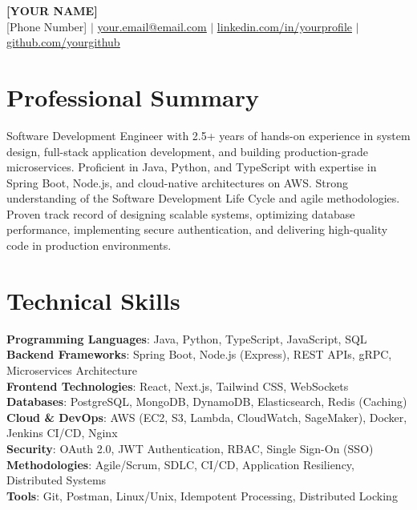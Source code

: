 \documentclass[letterpaper,11pt]{article}
\begin{document}
\begin{center}
    \textbf{\Huge \scshape [YOUR NAME]} \\ \vspace{1pt}
    \small [Phone Number] $|$ \href{mailto:your.email@email.com}{\underline{your.email@email.com}} $|$ 
    \href{https://linkedin.com/in/yourprofile}{\underline{linkedin.com/in/yourprofile}} $|$
    \href{https://github.com/yourgithub}{\underline{github.com/yourgithub}}
\end{center}

\section{Professional Summary}
Software Development Engineer with 2.5+ years of hands-on experience in system design, full-stack application development, and building production-grade microservices. Proficient in Java, Python, and TypeScript with expertise in Spring Boot, Node.js, and cloud-native architectures on AWS. Strong understanding of the Software Development Life Cycle and agile methodologies. Proven track record of designing scalable systems, optimizing database performance, implementing secure authentication, and delivering high-quality code in production environments.

\section{Technical Skills}
 \begin{itemize}[leftmargin=0.15in, label={}]
    \small{\item{
     \textbf{Programming Languages}{: Java, Python, TypeScript, JavaScript, SQL} \\
     \textbf{Backend Frameworks}{: Spring Boot, Node.js (Express), REST APIs, gRPC, Microservices Architecture} \\
     \textbf{Frontend Technologies}{: React, Next.js, Tailwind CSS, WebSockets} \\
     \textbf{Databases}{: PostgreSQL, MongoDB, DynamoDB, Elasticsearch, Redis (Caching)} \\
     \textbf{Cloud \& DevOps}{: AWS (EC2, S3, Lambda, CloudWatch, SageMaker), Docker, Jenkins CI/CD, Nginx} \\
     \textbf{Security}{: OAuth 2.0, JWT Authentication, RBAC, Single Sign-On (SSO)} \\
     \textbf{Methodologies}{: Agile/Scrum, SDLC, CI/CD, Application Resiliency, Distributed Systems} \\
     \textbf{Tools}{: Git, Postman, Linux/Unix, Idempotent Processing, Distributed Locking}
    }}
 \end{itemize}
\end{document}
